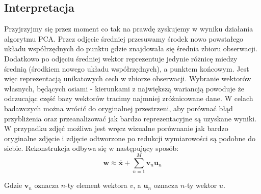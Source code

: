 \documentclass[oneside, eng]{mgr}
\newcommand{\bb}{\textbf}
\begin{document}
\subsection{Interpretacja}
Przyjrzyjmy się przez moment co tak na prawdę zyskujemy w wyniku działania algorytmu PCA. Przez odjęcie średniej przesuwamy środek nowo powstałego układu współrzędnych do punktu gdzie znajdowała się średnia zbioru obserwacji. Dodatkowo po odjęciu średniej wektor reprezentuje jedynie różnicę miedzy średnią (środkiem nowego układu współrzędnych), a punktem końcowym. Jest więc reprezentacją unikatowych cech w zbiorze obserwacji. Wybranie wektorów własnych, będących osiami - kierunkami z największą wariancją powoduje że odrzucając część bazy wektorów tracimy najmniej zróżnicowane dane. W celach badawczych można wrócić do oryginalnej przestrzeni, aby porównać błąd przybliżenia oraz przeanalizować jak bardzo reprezentacyjne są uzyskane wyniki. W przypadku zdjęć możliwa jest wręcz wizualne porównanie jak bardzo oryginalne zdjęcie i zdjęcie odtworzone po redukcji wymiarowości są podobne do siebie. Rekonstrukcja odbywa się w następujący sposób:
\begin{equation}
	\bb{w} \approx \overline{\bb{x}} + \sum_{n=1}^{M} \bb{v}_n \bb{u}_n
\end{equation}

Gdzie $\bb{v}_n$ oznacza $n$-ty element wektora $v$, a $\bb{u}_n$ oznacza $n$-ty wektor $u$.
\end{document}
